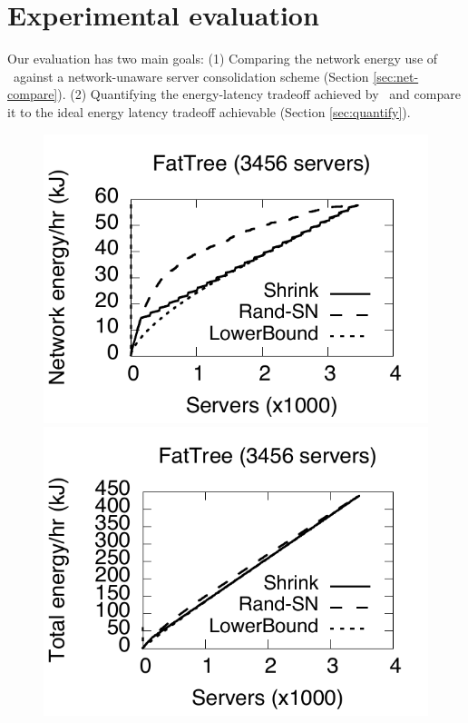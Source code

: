 \section{Experimental evaluation}
\label{sec:shrink-eval}
\newcommand{\peakS}{Peak-S}
\newcommand{\peakSN}{Peak-SN}
\newcommand{\randSN}{Rand-SN}

Our evaluation has two main goals: (1) Comparing the network energy use of \shrink\ against a network-unaware server consolidation scheme (Section \ref{sec:net-compare}). (2) Quantifying the energy-latency tradeoff achieved by \shrink\ and compare it to the ideal energy latency tradeoff achievable (Section \ref{sec:quantify}).

\begin{figure}[t]
        \includegraphics[scale=0.4]{graphs/final/fattree-24.pdf}
                \includegraphics[scale=0.4]{graphs/final/fattree-24-total.pdf}

\end{figure}
